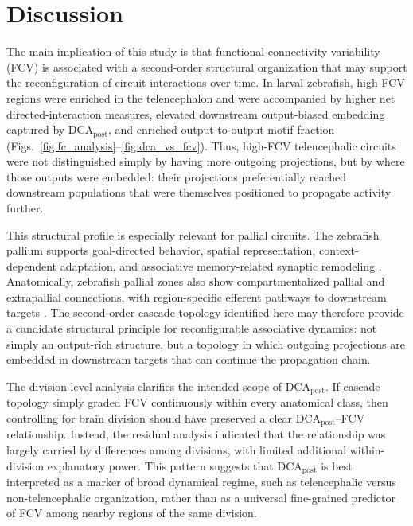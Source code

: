 \documentclass[9pt,twocolumn,twoside]{pnas-new}
\begin{document}
\section*{Discussion}

The main implication of this study is that functional connectivity variability (FCV) is associated with a second-order structural organization that may support the reconfiguration of circuit interactions over time. In larval zebrafish, high-FCV regions were enriched in the telencephalon and were accompanied by higher net directed-interaction measures, elevated downstream output-biased embedding captured by $\mathrm{DCA}_{\mathrm{post}}$, and enriched output-to-output motif fraction (Figs.~\ref{fig:fc_analysis}--\ref{fig:dca_vs_fcv}). Thus, high-FCV telencephalic circuits were not distinguished simply by having more outgoing projections, but by where those outputs were embedded: their projections preferentially reached downstream populations that were themselves positioned to propagate activity further.

This structural profile is especially relevant for pallial circuits. The zebrafish pallium supports goal-directed behavior, spatial representation, context-dependent adaptation, and associative memory-related synaptic remodeling \citep{tognoli2014metastable,Yang2024SpatialCode,Dempsey2022ZebrafishMemorySynapses}. Anatomically, zebrafish pallial zones also show compartmentalized pallial and extrapallial connections, with region-specific efferent pathways to downstream targets \citep{Yanez2022ZebrafishPalliumHodology}. The second-order cascade topology identified here may therefore provide a candidate structural principle for reconfigurable associative dynamics: not simply an output-rich structure, but a topology in which outgoing projections are embedded in downstream targets that can continue the propagation chain.

The division-level analysis clarifies the intended scope of $\mathrm{DCA}_{\mathrm{post}}$. If cascade topology simply graded FCV continuously within every anatomical class, then controlling for brain division should have preserved a clear $\mathrm{DCA}_{\mathrm{post}}$--FCV relationship. Instead, the residual analysis indicated that the relationship was largely carried by differences among divisions, with limited additional within-division explanatory power. This pattern suggests that $\mathrm{DCA}_{\mathrm{post}}$ is best interpreted as a marker of broad dynamical regime, such as telencephalic versus non-telencephalic organization, rather than as a universal fine-grained predictor of FCV among nearby regions of the same division.
\end{document}
